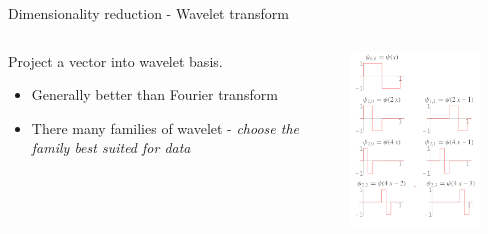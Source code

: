 \begin{frame}{Dimensionality reduction - Wavelet transform}
    \begin{columns}
    \begin{column}{0.5\textwidth}
        Project a vector into wavelet basis.
        \begin{itemize}
            \item Generally better than Fourier transform
            \item There many families of wavelet - \emph{choose the family best suited for data}
        \end{itemize}
        
    \end{column}
    \begin{column}{0.5\textwidth}
        \begin{center}
            \includegraphics[width=0.8\textwidth]{assets/haar_wavelet.png}
        \end{center}
    \end{column}
    \end{columns}
\end{frame}


